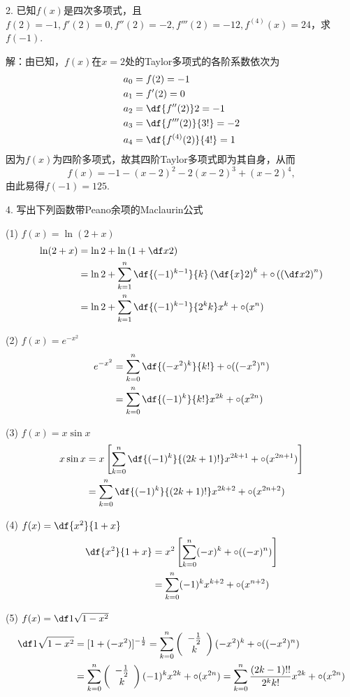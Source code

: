 \bigskip

2. 已知$f(x)$是四次多项式，且$f(2)=-1,f'(2)=0,f''(2)=-2,f'''(2)=-12,
f^{(4)}(x)=24$，求$f(-1)$.

解：由已知，$f(x)$在$x=2$处的Taylor多项式的各阶系数依次为
\begin{align}
	a_0&=f(2)=-1\notag\\
	a_1&={f'(2)}=0\notag\\
	a_2&=\df{f''(2)}2=-1\notag\\
	a_3&=\df{f'''(2)}{3!}=-2\notag\\
	a_4&=\df{f^{(4)}(2)}{4!}=1\notag
\end{align}
因为$f(x)$为四阶多项式，故其四阶Taylor多项式即为其自身，从而
$$f(x)=-1-(x-2)^2-2(x-2)^3+(x-2)^4,$$
由此易得$f(-1)=125$.

\bigskip

4. 写出下列函数带Peano余项的Maclaurin公式

(1) $f(x)=\ln(2+x)$
\begin{align}
	\ln(2+x)&=\ln2+\ln\left(1+\df x2\right)\notag\\
	&=\ln2+\sum\limits_{k=1}^n\df{(-1)^{k-1}}{k}\left(
	\df{x}2\right)^k+\circ\left(\left(\df x2\right)^n\right)\notag\\
	&=\ln2+\sum\limits_{k=1}^n\df{(-1)^{k-1}}{2^kk}x^k+\circ(x^n)\notag
\end{align}

(2) $f(x)=e^{-x^2}$
\begin{align}
	e^{-x^2}&=\sum\limits_{k=0}^n\df{(-x^2)^k}{k!}+\circ((-x^2)^n)\notag\\
	&=\sum\limits_{k=0}^n\df{(-1)^k}{k!}x^{2k}+\circ(x^{2n})\notag
\end{align}

(3) $f(x)=x\sin x$
\begin{align}
	x\sin x&=x\left[\sum\limits_{k=0}^n\df{(-1)^k}{(2k+1)!}x^{2k+1}
	+\circ(x^{2n+1})\right]\notag\\
	&=\sum\limits_{k=0}^n\df{(-1)^k}{(2k+1)!}x^{2k+2}
	+\circ(x^{2n+2})\notag
\end{align}

(4) $f(x)=\df{x^2}{1+x}$
\begin{align}
	\df{x^2}{1+x}&=x^2\left[\sum\limits_{k=0}^n(-x)^k
	+\circ((-x)^n)\right]\notag\\
	&=\sum\limits_{k=0}^n(-1)^kx^{k+2}+\circ(x^{n+2})\notag
\end{align}

(5) $f(x)=\df1{\sqrt{1-x^2}}$
\begin{align*}
	\df1{\sqrt{1-x^2}}&=[1+(-x^2)]^{-\frac12}
	=\sum\limits_{k=0}^n\left(\begin{array}{c}
	-\frac12 \\ k\end{array}\right)
	(-x^2)^k+\circ((-x^2)^n) \\
	&=\sum\limits_{k=0}^n\left(\begin{array}{c}
	-\frac12 \\ k\end{array}\right)
	(-1)^kx^{2k}+\circ(x^{2n})
	=\sum\limits_{k=0}^n\frac{(2k-1)!!}{2^kk!}x^{2k}
	+\circ(x^{2n})
\end{align*}

